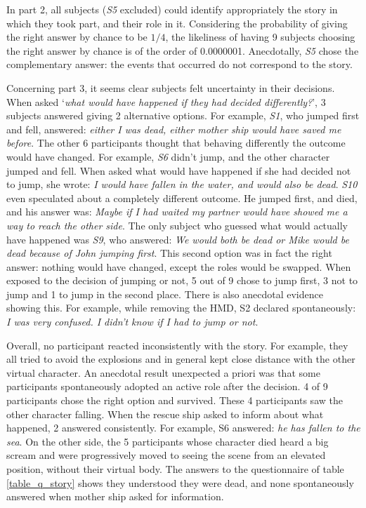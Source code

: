 \documentclass[
		twoside,openright,titlepage,numbers=noenddot,manychapters,
		headinclude,%
                footinclude=false,cleardoublepage=empty,
                BCOR=5mm,
		fontsize=11pt, %
                 enabledeprecatedfontcommands]{scrreprt}
\begin{document}
In part 2, all subjects (\emph{S5} excluded) could identify appropriately the story in which they took part, and their role in it. Considering the probability of giving the right answer by chance to be $1/4$, the likeliness of having 9 subjects choosing the right answer by chance is of the order of 0.0000001. Anecdotally, \emph{S5} chose the complementary answer: the events that occurred do not correspond to the story.

Concerning part 3, it seems clear subjects felt uncertainty in their decisions. When asked `\emph{what would have happened if they had decided differently?}', 3 subjects answered giving 2 alternative options. For example, \emph{S1}, who jumped first and fell, answered: \emph{either I was dead, either mother ship would have saved me before}. The other 6 participants thought that behaving differently the outcome would have changed. For example, \emph{S6} didn’t jump, and the other character jumped and fell. When asked what would have happened if she had decided not to jump, she wrote: \emph{I would have fallen in the water, and would also be dead}. \emph{S10} even speculated about a completely different outcome. He jumped first, and died, and his answer was: \emph{Maybe if I had waited my partner would have showed me a way to reach the other side}. The only subject who guessed what would actually have happened was \emph{S9}, who answered: \emph{We would both be dead or Mike would be dead because of John jumping first}. This second option was in fact the right answer: nothing would have changed, except the roles would be swapped. When exposed to the decision of jumping or not, 5 out of 9 chose to jump first, 3 not to jump and 1 to jump in the second place. There is also anecdotal evidence showing this. For example, while removing the HMD, S2 declared spontaneously: \emph{I was very confused. I didn’t know if I had to jump or not}.

Overall, no participant reacted inconsistently with the story. For example, they all tried to avoid the explosions and in general kept close distance with the other virtual character. An anecdotal result unexpected a priori was that some participants spontaneously adopted an active role after the decision. 4 of 9 participants chose the right option and survived. These 4 participants saw the other character falling. When the rescue ship asked to inform about what happened, 2 answered consistently. For example, S6 answered: \emph{he has fallen to the sea}. On the other side, the 5 participants whose character died heard a big scream and were progressively moved to seeing the scene from an elevated position, without their virtual body. The answers to the questionnaire of table \ref{table_q_story} shows they understood they were dead, and none spontaneously answered when mother ship asked for information.
\end{document}
